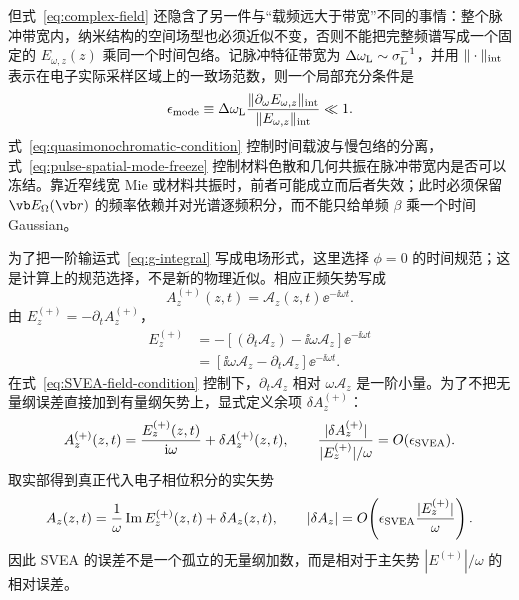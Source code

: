 但式~\cref{eq:complex-field} 还隐含了另一件与“载频远大于带宽”不同的事情：整个脉冲带宽内，纳米结构的空间场型也必须近似不变，否则不能把完整频谱写成一个固定的 $E_{\omega,z}(z)$ 乘同一个时间包络。记脉冲特征带宽为 $\Delta\omega_{\rm L}\sim\sigma_{\rm L}^{-1}$，并用 $\|\cdot\|_{\rm int}$ 表示在电子实际采样区域上的一致场范数，则一个局部充分条件是
\begin{equation}
{
\epsilon_{\rm mode}
\equiv
\Delta\omega_{\rm L}
\frac{\|\partial_\omega E_{\omega,z}\|_{\rm int}}
{\|E_{\omega,z}\|_{\rm int}}
\ll1.}
\label{eq:pulse-spatial-mode-freeze}
\end{equation}
式~\cref{eq:quasimonochromatic-condition} 控制时间载波与慢包络的分离，式~\cref{eq:pulse-spatial-mode-freeze} 控制材料色散和几何共振在脉冲带宽内是否可以冻结。靠近窄线宽 Mie 或材料共振时，前者可能成立而后者失效；此时必须保留 $\vb E_{\Omega}(\vb r)$ 的频率依赖并对光谱逐频积分，而不能只给单频 $\beta$ 乘一个时间 Gaussian。

为了把一阶输运式~\cref{eq:g-integral} 写成电场形式，这里选择 $\phi=0$ 的时间规范；这是计算上的规范选择，不是新的物理近似。相应正频矢势写成
\begin{equation}
 A_z^{(+)}(z,t)
 =\mathcal A_z(z,t)\ee^{-\ii\omega t}.
\end{equation}
由 $E_z^{(+)}=-\partial_tA_z^{(+)}$，
\begin{align}
E_z^{(+)}
&=-\left[(\partial_t\mathcal A_z)-\ii\omega\mathcal A_z\right]
 \ee^{-\ii\omega t}\\
&=\left[\ii\omega\mathcal A_z-\partial_t\mathcal A_z\right]
 \ee^{-\ii\omega t}.
\end{align}
在式~\cref{eq:SVEA-field-condition} 控制下，$\partial_t\mathcal A_z$ 相对 $\omega\mathcal A_z$ 是一阶小量。为了不把无量纲误差直接加到有量纲矢势上，显式定义余项 $\delta A_z^{(+)}$：
\begin{equation}
 A_z^{(+)}(z,t)
 =\frac{E_z^{(+)}(z,t)}{\mathrm{i}\omega}
 +\delta A_z^{(+)}(z,t),
 \qquad
 \frac{|\delta A_z^{(+)}|}{|E_z^{(+)}|/\omega}
 =O(\epsilon_{\rm SVEA}).
 \label{eq:A-from-E-positive-frequency}
\end{equation}
取实部得到真正代入电子相位积分的实矢势
\begin{equation}
 A_z(z,t)
 =\frac{1}{\omega}\operatorname{Im}E_z^{(+)}(z,t)
 +\delta A_z(z,t),
 \qquad
 |\delta A_z|=O\!\left(\epsilon_{\rm SVEA}\frac{|E_z^{(+)}|}{\omega}\right).
 \label{eq:A-from-E}
\end{equation}
因此 SVEA 的误差不是一个孤立的无量纲加数，而是相对于主矢势 $|E^{(+)}|/\omega$ 的相对误差。

